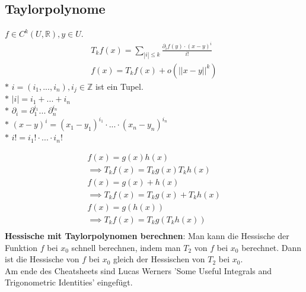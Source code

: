 \subsection{Taylorpolynome}
    \(f\in C^k(U,\mathbb R), y\in U\).\\
    \[\begin{array}{cc}
      T_kf(x)=\sum\limits_{|i|\leq k}\frac{\partial_if(y)\cdot(x-y)^i}{i!}\\
      f(x)=T_kf(x)+o(||x-y||^k)
    \end{array}\]
    \(*\) \(i=(i_1,...,i_n), i_j\in\mathbb Z\) ist ein Tupel.\\
    \(*\) \(|i| = i_1+...+i_n\)\\
    \(*\) \(\partial_i=\partial_1^{i_1}...\;\partial_n^{i_n}\)\\
    \(*\) \((x-y)^i=(x_1-y_1)^{i_1}\cdot...\cdot(x_n-y_n)^{i_n}\)\\
    \(*\) \(i!=i_1!\cdot...\cdot i_n!\)

    \[\begin{array}{ll}
      f(x)=g(x)h(x) \\\implies T_kf(x)=T_kg(x)T_kh(x)\\
      f(x)=g(x)+h(x) \\\implies T_kf(x)=T_kg(x)+T_kh(x)\\
      f(x)=g(h(x))   \\\implies T_kf(x)=T_kg(T_kh(x))\\
    \end{array} \]
    \textbf{Hessische mit Taylorpolynomen berechnen}: Man kann die Hessische der Funktion $f$ bei $x_0$ schnell berechnen,
    indem man $T_2$ von $f$ bei $x_0$ berechnet. Dann ist die Hessische von $f$ bei $x_0$ gleich der Hessischen von $T_2$ bei $x_0$.\\
  Am ende des Cheatsheets sind Lucas Werners 'Some Useful Integrals and
  Trigonometric Identities' eingefügt.
